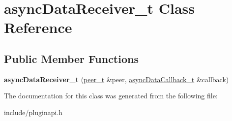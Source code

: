 \hypertarget{classasyncDataReceiver__t}{\section{async\-Data\-Receiver\-\_\-t \-Class \-Reference}
\label{classasyncDataReceiver__t}
}
\subsection*{\-Public \-Member \-Functions}
\begin{DoxyCompactItemize}
\item 
\hypertarget{classasyncDataReceiver__t_a491a5329d577f66cbcd24e6b9281f24e}{{\bfseries async\-Data\-Receiver\-\_\-t} (\hyperlink{classpeer__t}{peer\-\_\-t} \&peer, \hyperlink{classasyncDataCallback__t}{async\-Data\-Callback\-\_\-t} \&callback)}\label{classasyncDataReceiver__t_a491a5329d577f66cbcd24e6b9281f24e}

\end{DoxyCompactItemize}


\-The documentation for this class was generated from the following file\-:\begin{DoxyCompactItemize}
\item 
include/pluginapi.\-h\end{DoxyCompactItemize}
